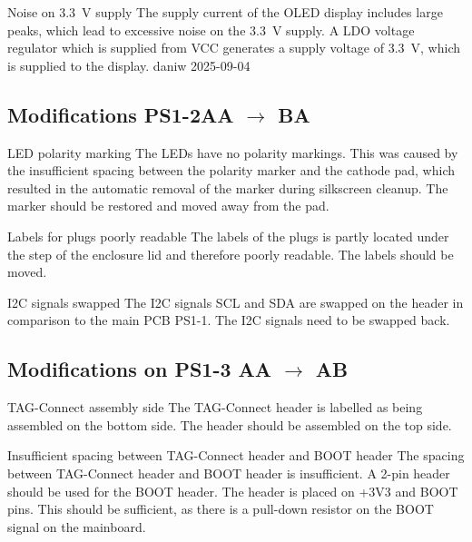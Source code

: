 \begin{ModTable}

\ModItemDone
{Noise on \qty{3.3}{\volt} supply}
{The supply current of the \ac{OLED} display includes large peaks, which lead to excessive noise on the \qty{3.3}{\volt} supply. }
{A \ac{LDO} voltage regulator which is supplied from VCC generates a supply voltage of \qty{3.3}{\volt}, which is supplied to the display. }
{daniw}
{2025-09-04}

\end{ModTable}

\FloatBarrier

\subsection{Modifications PS1-2AA $\to$ BA}

\begin{ModTable}

\ModItemOpen
{LED polarity marking}
{The LEDs have no polarity markings. This was caused by the insufficient spacing between the polarity marker and the cathode pad, which resulted in the automatic removal of the marker during silkscreen cleanup. }
{The marker should be restored and moved away from the pad. }
{}
{}

\ModItemOpen
{Labels for plugs poorly readable}
{The labels of the plugs is partly located under the step of the enclosure lid and therefore poorly readable. }
{The labels should be moved. }
{}
{}

\ModItemOpen
{\acs{I2C} signals swapped}
{The \ac{I2C} signals SCL and SDA are swapped on the header in comparison to the main PCB PS1-1. }
{The \ac{I2C} signals need to be swapped back. }
{}
{}

\end{ModTable}

\FloatBarrier

\subsection{Modifications on PS1-3 AA $\to$ AB}

\begin{ModTable}

\ModItemOpen
{TAG-Connect assembly side}
{The TAG-Connect header is labelled as being assembled on the bottom side. }
{The header should be assembled on the top side. }
{}
{}

\ModItemOpen
{Insufficient spacing between TAG-Connect header and BOOT header}
{The spacing between TAG-Connect header and BOOT header is insufficient. }
{A 2-pin header should be used for the BOOT header. The header is placed on +3V3 and BOOT pins. This should be sufficient, as there is a pull-down resistor on the BOOT signal on the mainboard. }
{}
{}

\end{ModTable}

